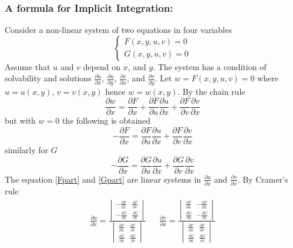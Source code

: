 \documentclass[14pt]{article}
\begin{document}
    \subsubsection{A formula for Implicit Integration:}
    Consider a non-linear system of two equations in four variables
    $$\left\{\begin{array}{lr} F(x,y,u,v)=0\\
        G(x,y,u,v)=0 \end{array}\right.$$ Assume that $u$ and $v$ depend
    on $x$, and $y$. The system has a condition of solvability and
    solutions $\frac{\partial u}{\partial x}$, $\frac{\partial
    u}{\partial y}$, $\frac{\partial v}{\partial x}$, and
    $\frac{\partial v}{\partial y}$. Let $w=F(x,y,u,v)=0$ where
    $u=u(x,y)$, $v=v(x,y)$ hence $w=w(x,y)$. By the chain rule
    $$\frac{\partial w}{\partial x}=\frac{\partial F}{\partial
    x}+\frac{\partial F}{\partial u}\frac{\partial u}{\partial
    x}+\frac{\partial F}{\partial v}\frac{\partial v}{\partial x}$$ but
    with $w=0$ the following is obtained 
    \begin{equation}\label{Fpart}
        -\frac{\partial F}{\partial x}=\frac{\partial F}{\partial u}\frac{\partial u}{\partial x}+\frac{\partial F}{\partial v}\frac{\partial v}{\partial x}
    \end{equation}
    similarly for $G$
    \begin{equation}\label{Gpart}
        -\frac{\partial G}{\partial x}=\frac{\partial G}{\partial u}\frac{\partial u}{\partial x}+\frac{\partial G}{\partial v}\frac{\partial v}{\partial x}
    \end{equation}
    The equation \eqref{Fpart} and \eqref{Gpart} are linear systems in
    $\frac{\partial u}{\partial x}$ and $\frac{\partial v}{\partial x}$.
    By Cramer's rule
    \begin{align*}
        \frac{\partial u}{\partial x}=\frac{\begin{vmatrix}
            -\frac{\partial F}{\partial x} & \frac{\partial F}{\partial v}\\
            -\frac{\partial G}{\partial x} & \frac{\partial G}{\partial v}
        \end{vmatrix}}{\begin{vmatrix}
            \frac{\partial F}{\partial u} & \frac{\partial F}{\partial v}\\
            \frac{\partial G}{\partial u} & \frac{\partial G}{\partial v}
        \end{vmatrix}} &&
        \frac{\partial v}{\partial x}=\frac{\begin{vmatrix}
            \frac{\partial F}{\partial u} & -\frac{\partial F}{\partial x}\\
            \frac{\partial G}{\partial u} & -\frac{\partial G}{\partial x}
        \end{vmatrix}}{\begin{vmatrix}
            \frac{\partial F}{\partial u} & \frac{\partial F}{\partial v}\\
            \frac{\partial G}{\partial u} & \frac{\partial G}{\partial v}
        \end{vmatrix}}
    \end{align*}
\end{document}
